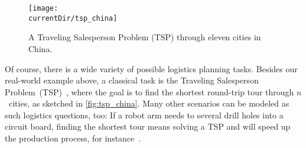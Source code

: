 \begin{figure}%
\centering%
\texttt{[image: \\currentDir/tsp\_china]}%
\caption{A Traveling Salesperson Problem (TSP) through eleven cities in China.}%
\label{fig:tsp_china}%
\end{figure}%
%
Of course, there is a wide variety of possible logistics planning tasks.
Besides our real-world example above, a classical task is the Traveling Salesperson Problem~(TSP)~\cite{ABCC2006TTSPACS,LLRKS1985TTSPAGTOCO,GP2002TTSPAIV}, where the goal is to find the shortest round-trip tour through $n$~cities, as sketched in \autoref{fig:tsp_china}.
Many other scenarios can be modeled as such logistics questions, too:
If a robot arm needs to several drill holes into a circuit board, finding the shortest tour means solving a TSP and will speed up the production process, for instance~\cite{GJR1991OCOPADMACS}.%
\endhsection%
%
